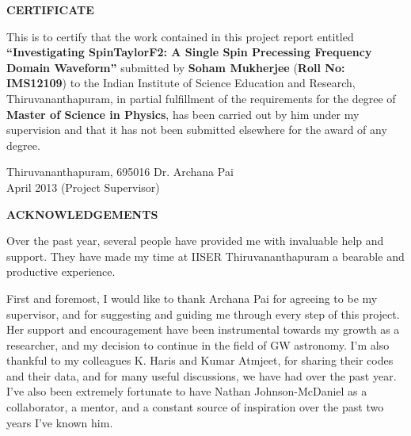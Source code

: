 \documentclass[12pt, a4wide]{report}
\begin{document}
\setcounter{page}{2}
\begin{center}
{\textbf{CERTIFICATE}}
\end{center}

\noindent
This is to certify that the work contained in this project report entitled
\textbf{``Investigating SpinTaylorF2: A Single Spin Precessing Frequency
Domain Waveform''}  submitted by \textbf{Soham Mukherjee} (\textbf{Roll No:
IMS12109}) to the Indian Institute of Science Education and Research,
Thiruvananthapuram, in partial fulfillment of the requirements for the degree
of {\bf Master of Science in Physics}, has been carried out by
him under my supervision and that it has not been submitted elsewhere for the
award of any degree.

\vspace{4cm}

\noindent Thiruvananthapuram, 695016 \hfill Dr. Archana Pai\\
\noindent April 2013 \hfill (Project Supervisor)\\

\clearpage

\begin{center}
\textbf{ACKNOWLEDGEMENTS}\\
\end{center}

Over the past year, several people have provided me with invaluable help and
support. They have made my time at IISER Thiruvananthapuram a bearable and
productive experience.

First and foremost, I would like to thank Archana Pai for agreeing to be my
supervisor, and for suggesting and guiding me through every step of this
project. Her support and encouragement have been instrumental towards my growth
as a researcher, and my decision to continue in the field of GW astronomy. I'm
also thankful to my colleagues K. Haris and Kumar Atmjeet, for sharing their
codes and their data, and for many useful discussions, we have had over the
past year. I've also been extremely fortunate to have Nathan Johnson-McDaniel
as a collaborator, a mentor, and a constant source of inspiration over the
past two years I've known him.
\end{document}
